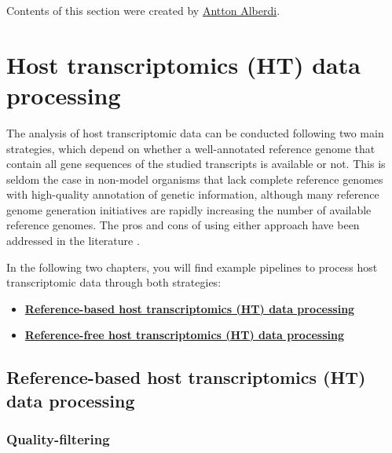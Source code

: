 \documentclass[
]{book}
\providecommand{\tightlist}{%
  \setlength{\itemsep}{0pt}\setlength{\parskip}{0pt}}
\begin{document}
Contents of this section were created by \protect\hyperlink{antton-alberdi}{Antton Alberdi}.

\hypertarget{host-transcriptomics-data-processing}{%
\chapter{Host transcriptomics (HT) data processing}\label{host-transcriptomics-data-processing}}

The analysis of host transcriptomic data can be conducted following two main strategies, which depend on whether a well-annotated reference genome that contain all gene sequences of the studied transcripts is available or not. This is seldom the case in non-model organisms that lack complete reference genomes with high-quality annotation of genetic information, although many reference genome generation initiatives are rapidly increasing the number of available reference genomes. The pros and cons of using either approach have been addressed in the literature \citep{Lee2021-th}.

In the following two chapters, you will find example pipelines to process host transcriptomic data through both strategies:

\begin{itemize}
\tightlist
\item
  \textbf{\protect\hyperlink{host-transcriptomics-data-processing-reference-based}{Reference-based host transcriptomics (HT) data processing}}
\item
  \textbf{\protect\hyperlink{host-transcriptomics-data-processing-reference-free}{Reference-free host transcriptomics (HT) data processing}}
\end{itemize}

\hypertarget{host-transcriptomics-data-processing-reference-based}{%
\section{Reference-based host transcriptomics (HT) data processing}\label{host-transcriptomics-data-processing-reference-based}}

\hypertarget{quality-filtering}{%
\subsection*{Quality-filtering}\label{quality-filtering}}
\end{document}
